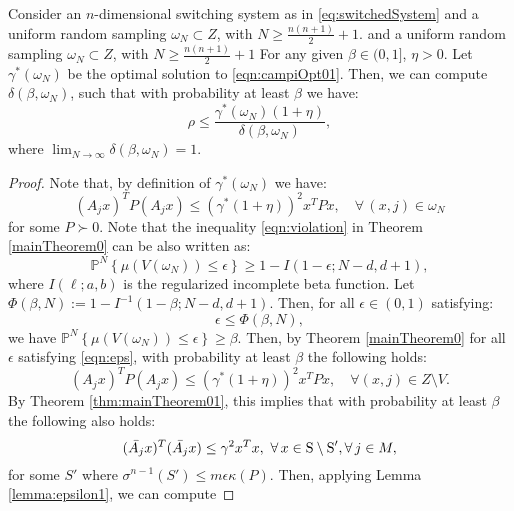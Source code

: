 
\begin{theorem}\label{thm:mainTheorem}Consider an $n$-dimensional switching system as in \eqref{eq:switchedSystem} and a uniform random sampling $\omega_N \subset Z$, with $N \geq \frac{n(n+1)}{2}+1$. and a uniform random sampling $\omega_N \subset Z$, with $N \geq \frac{n(n+1)}{2}+1$ For any given $\beta \in (0,1]$, $\eta > 0$. Let $\gamma^*(\omega_N) $ be the optimal solution to \eqref{eqn:campiOpt01}. Then, we can compute $\delta(\beta, \omega_N)$, such that with probability at least $\beta$ we have:
$$\rho \leq \frac{\gamma^*(\omega_N) (1+ \eta)}{\delta(\beta, \omega_N)},$$
where $\lim_{N \to \infty}\delta(\beta, \omega_N) = 1$.
\end{theorem}

\begin{proof}
Note that, by definition of $\gamma^*(\omega_N)$ we have:
\begin{equation*} (A_j x)^TP(A_j x) \leq {(\gamma^*(1+\eta))}^2 x^TPx, \quad \forall\, (x, j)  \in \omega_N \end{equation*}
for some $P \succ 0$. 
Note that the inequality \eqref{eqn:violation} in Theorem \ref{mainTheorem0} can be also written as:
\begin{equation}\label{eqn:violation2}\mathbb{P}^N\left\{ \mu(V(\omega_N)) \leq \epsilon \right\} \geq 1- I(1-\epsilon; N-d, d+1),\end{equation}
where $I(\ell;a,b)$ is the regularized incomplete beta function. Let $\Phi(\beta, N):=1- I^{-1}(1-\beta; N-d, d+1)$. Then, for all $\epsilon \in (0,1)$ satisfying:
\begin{equation}\label{eqn:eps}\epsilon \leq \Phi(\beta, N),\end{equation} we have $\mathbb{P}^N\left\{ \mu(V(\omega_N)) \leq \epsilon \right\} \geq \beta$.
Then, by Theorem \ref{mainTheorem0} for all $\epsilon$ satisfying \eqref{eqn:eps}, with probability at least $\beta$ the following holds:
\begin{equation*} (A_jx)^TP(A_jx) \leq  {(\gamma^*(1+\eta))}^2 x^TPx, \quad \forall (x, j) \in Z \setminus V.\end{equation*}
By Theorem \ref{thm:mainTheorem01}, this implies that with probability at least $\beta$ the following also holds:
\begin{equation*}(\bar{A_j} x)^T(\bar{A_j} x) \leq {\gamma}^2x^Tx,\,\, \forall\, x \in \text{S} \setminus \text{S}', \forall\, j \in M,\end{equation*}
for some $S'$ where $\sigma^{n-1}(S') \leq m\epsilon \kappa(P).$ Then, applying Lemma \ref{lemma:epsilon1}, we can compute

\end{proof}
